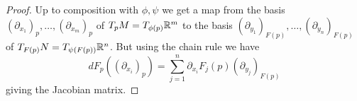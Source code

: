 \begin{proof}
    Up to composition with $\phi,\psi$ we get a map from the basis $(\partial_{x_{1}})_{p},\dots,(\partial_{x_{m}})_{p}$ of $T_{p}M=T_{\phi(p)}\mathbb{R}^{m}$ to the basis $(\partial_{y_{1}})_{F(p)},\dots,(\partial_{y_{n}})_{F(p)}$ of $T_{F(p)}N=T_{\psi(F(p))}\mathbb{R}^{n}$. But using the chain rule we have 
    $$dF_{p}((\partial_{x_{i}})_{p})=\sum_{j=1}^{n}\partial_{x_{i}}F_{j}(p)(\partial_{y_{j}})_{F(p)}$$
    giving the Jacobian matrix. 
\end{proof}